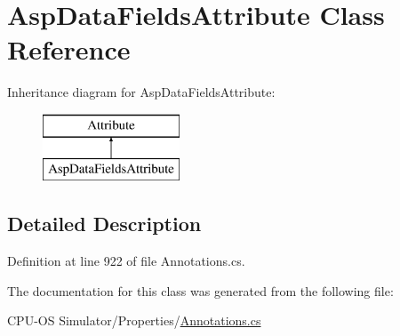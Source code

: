 \hypertarget{class_asp_data_fields_attribute}{}\section{Asp\+Data\+Fields\+Attribute Class Reference}
\label{class_asp_data_fields_attribute}
Inheritance diagram for Asp\+Data\+Fields\+Attribute\+:\begin{figure}[H]
\begin{center}
\leavevmode
\includegraphics[height=2.000000cm]{class_asp_data_fields_attribute}
\end{center}
\end{figure}


\subsection{Detailed Description}


Definition at line 922 of file Annotations.\+cs.



The documentation for this class was generated from the following file\+:\begin{DoxyCompactItemize}
\item 
C\+P\+U-\/\+O\+S Simulator/\+Properties/\hyperlink{_annotations_8cs}{Annotations.\+cs}\end{DoxyCompactItemize}
